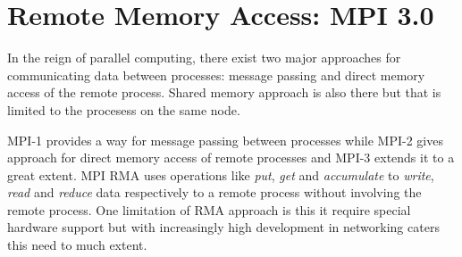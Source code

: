 \section{Remote Memory Access: MPI 3.0}
In the reign of parallel computing, there exist two major approaches for communicating data between processes:
message passing and direct memory access of the remote process. Shared memory approach is also there but that 
is limited to the procesess on the same node. 

MPI-1 provides a way for message passing between processes while MPI-2 gives approach for direct memory access of remote processes and MPI-3 extends it to a great extent. MPI RMA \cite{rmabook} uses operations like \textit{put}, \textit{get} and \textit{accumulate} to \textit{write}, \textit{read} and \textit{reduce} data respectively to a remote process without involving the remote process. One limitation of RMA approach is this it require special hardware support but with increasingly high development in networking caters this need to much extent.

